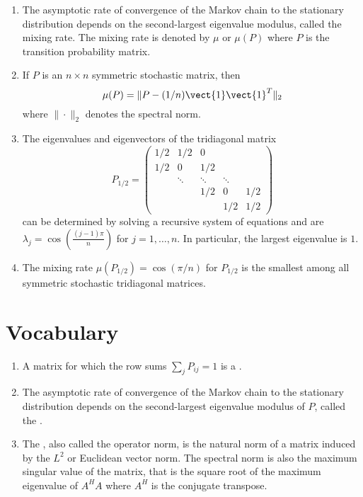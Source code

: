 \documentclass[12pt]{article}
\begin{document}
\begin{enumerate}
    \item
        The asymptotic rate of convergence of the Markov chain to the
        stationary distribution depends on the second-largest eigenvalue
        modulus, called the mixing rate.  The mixing rate is denoted by \(
        \mu \) or \( \mu(P) \) where \( P \) is the transition
        probability matrix.
    \item
        If \( P \) is an \( n \times n \) symmetric stochastic matrix,
        then
        \[
            \mu(P) = \| P - (1/n) \vect{1}\vect{1}^T \|_2
        \] where \( \| \cdot \|_2 \) denotes the spectral norm.
    \item
        The eigenvalues and eigenvectors of the tridiagonal matrix
        \[
            P_{1/2} =
            \begin{pmatrix}
                1/2 & 1/2 & 0 & & \\
                1/2 & 0 & 1/2 & & \\
                & \ddots & \ddots & \ddots& \\
                & & 1/2 & 0 & 1/2 \\
                & & & 1/2 & 1/2
            \end{pmatrix}
        \] can be determined by solving a recursive system of equations
        and are \( \lambda_j = \cos\left( \frac{(j-1) \pi}{n} \right) \)
        for \( j = 1,\dots, n \).  In particular, the largest eigenvalue
        is \( 1 \).
    \item
        The mixing rate \( \mu(P_{1/2}) = \cos(\pi/n) \) for \( P_{1/2} \)
        is the smallest among all symmetric stochastic tridiagonal
        matrices.
\end{enumerate}

\hr

\section*{Vocabulary}
\begin{enumerate}
    \item
        A matrix for which the row sums \( \sum_{j} P_{ij} = 1 \) is a
        .
    \item
        The asymptotic rate of convergence of the Markov chain to the
        stationary distribution depends on the second-largest eigenvalue
        modulus of \( P \), called the .
    \item
        The , also called the operator norm, is the
        natural norm of a matrix induced by the \( L^2 \) or Euclidean
        vector norm.  The spectral norm is also the maximum singular
        value of the matrix, that is the square root of the maximum
        eigenvalue of \( A^H A \) where \( A^H \) is the conjugate
        transpose.
\end{enumerate}
\end{document}
